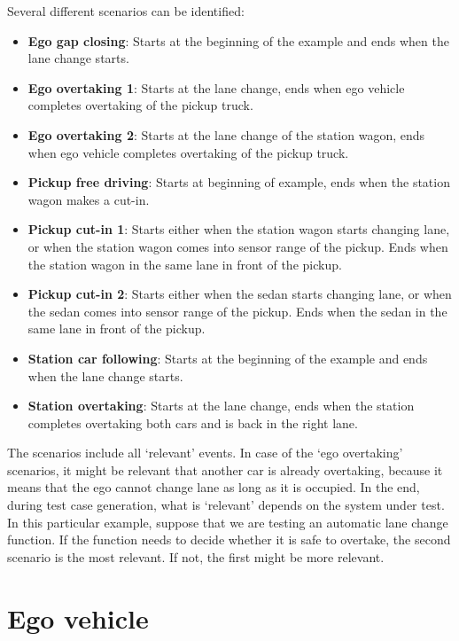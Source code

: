 \documentclass[10pt,final,a4paper,oneside,onecolumn]{article}
\theoremstyle{plain}\newtheorem{definition}{Definition}[section]    %
\theoremstyle{definition}\newtheorem{example}{Example}[section]     %
\theoremstyle{remark}\newtheorem{remarkenv}{Remark}[section]        %
\begin{document}
Several different scenarios can be identified:
\begin{itemize} 
    \item \textbf{Ego gap closing}: Starts at the beginning of the example and ends when the lane change starts.
    \item \textbf{Ego overtaking 1}: Starts at the lane change, ends when ego vehicle completes overtaking of the pickup truck.
    \item \textbf{Ego overtaking 2}: Starts at the lane change of the station wagon, ends when ego vehicle completes overtaking of the pickup truck.
    \item \textbf{Pickup free driving}: Starts at beginning of example, ends when the station wagon makes a cut-in.
    \item \textbf{Pickup cut-in 1}: Starts either when the station wagon starts changing lane, or when the station wagon comes into sensor range of the pickup. Ends when the station wagon in the same lane in front of the pickup.
    \item \textbf{Pickup cut-in 2}: Starts either when the sedan starts changing lane, or when the sedan comes into sensor range of the pickup. Ends when the sedan in the same lane in front of the pickup.
    \item \textbf{Station car following}: Starts at the beginning of the example and ends when the lane change starts.
    \item \textbf{Station overtaking}: Starts at the lane change, ends when the station completes overtaking both cars and is back in the right lane.
\end{itemize}
The scenarios include all `relevant' events. In case of the `ego overtaking' scenarios, it might be relevant that another car is already overtaking, because it means that the ego cannot change lane as long as it is occupied. In the end, during test case generation, what is `relevant' depends on the system under test. In this particular example, suppose that we are testing an automatic lane change function. If the function needs to decide whether it is safe to overtake, the second scenario is the most relevant. If not, the first might be more relevant.

\section{Ego vehicle}
\end{document}
